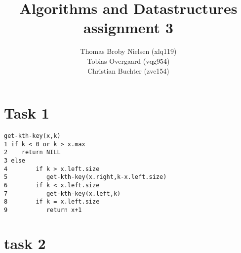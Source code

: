 \documentclass[12pt]{article}
\title{Algorithms and Datastructures assignment 3}
\author{Thomas Broby Nielsen (xlq119)\\ Tobias Overgaard (vqg954)\\ Christian Buchter (zvc154)}
\begin{document}
\maketitle

\tableofcontents

\pagebreak
\section{Task 1}
\begin{verbatim}
get-kth-key(x,k)
1 if k < 0 or k > x.max
2    return NILL
3 else
4        if k > x.left.size
5           get-kth-key(x.right,k-x.left.size)
6        if k < x.left.size
7           get-kth-key(x.left,k)
8        if k = x.left.size
9           return x+1
\end{verbatim}

\newpage
\section{task 2}

\newpage
\end{document}
